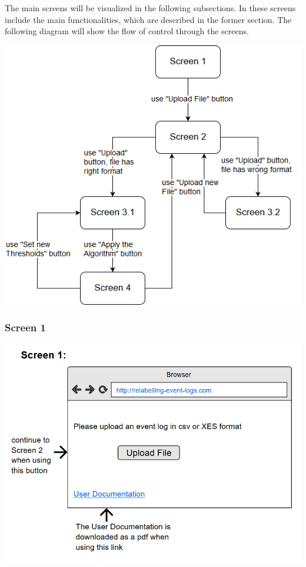 \documentclass[notitlepage]{article}
\begin{document}
\begin{flushleft}
The main screens will be visualized in the following subsections. In these screens include the main functionalities, which are described in the former section. The following diagram will show the flow of control through the screens.  

\includegraphics[scale=0.7]{ScreenFlow.png}

\subsubsection{Screen 1}

\includegraphics[scale=0.8]{InterfaceMockup1.png}



\end{flushleft}
\end{document}
